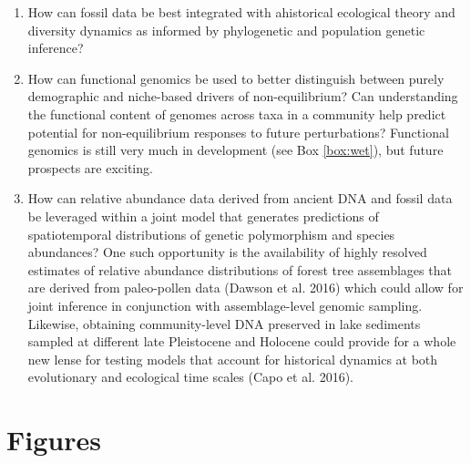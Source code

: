 \documentclass[12pt]{article}
\newcounter{Box}
\begin{document}
\begin{enumerate}
\item How can fossil data be best integrated with ahistorical
  ecological theory and diversity dynamics as informed by phylogenetic
  and population genetic inference?
\item How can functional genomics be used to better distinguish
  between purely demographic and niche-based drivers of
  non-equilibrium? Can understanding the functional content of genomes
  across taxa in a community help predict potential for
  non-equilibrium responses to future perturbations? Functional
  genomics is still very much in development (see Box \ref{box:wet}),
  but future prospects are exciting.
\item How can relative abundance data derived from ancient DNA and fossil data be leveraged within a joint model that generates predictions of spatiotemporal distributions of genetic polymorphism and species abundances? One such opportunity is the availability of highly resolved estimates of relative abundance distributions of forest tree assemblages that are derived from paleo-pollen data (Dawson et al. 2016) which could allow for joint inference in conjunction with assemblage-level genomic sampling. Likewise, obtaining community-level DNA preserved in lake sediments sampled at different late Pleistocene and Holocene could provide for a whole new lense for testing models that account for historical dynamics at both evolutionary and ecological time scales (Capo et al. 2016). 
% 
% 
\end{enumerate}

\pagebreak

\section*{Figures}
\end{document}
